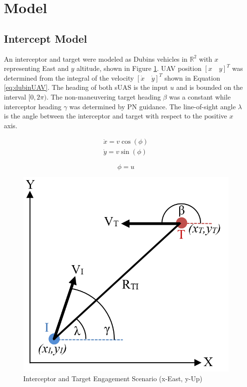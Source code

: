 \documentclass[conference]{IEEEtran}
\begin{document}

\section{Model}

\subsection{Intercept Model}
An interceptor and target were modeled as Dubins vehicles in $\mathbb{R}^2$ with $x$ representing East and $y$ altitude, shown in Figure \ref{fig:Egagement}. UAV position $[x \quad y]^T$ was determined from the integral of the velocity $[\dot{x} \quad \dot{y}]^T$ shown in Equation \ref{eq:dubinUAV}. The heading of both sUAS is the input $u$ and is bounded on the interval $[0,2\pi)$. The non-maneuvering target heading $\beta$ was a constant while interceptor heading $\gamma$ was determined by PN guidance. The line-of-sight angle $\lambda$ is the angle between the interceptor and target with respect to the positive $x$ axis. 



\begin{equation} \label{eq:dubinUAV}
\begin{split}
\dot{x} = v\cos(\phi)\\
\dot{y} = v\sin(\phi)
\end{split}
\end{equation}

\begin{equation}\label{eq:dubinsVel}
\phi = u
\end{equation}
 

\begin{figure}[H]
	\centering
	\includegraphics[width=6 cm]{Engagement_Model.PNG}
	\caption{Interceptor and Target Engagement Scenario (x-East, y-Up)}
	\label{fig:Egagement}
\end{figure}
\end{document}
